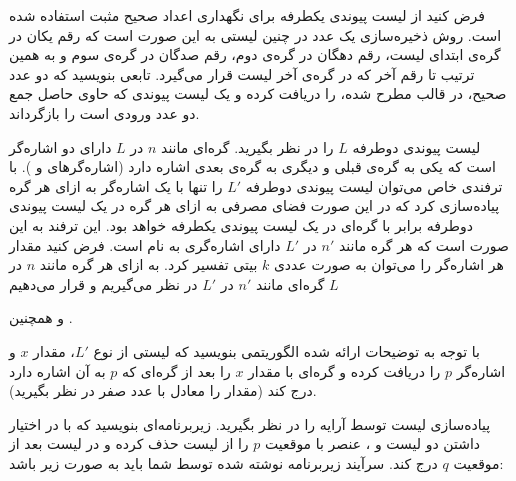  فرض کنید از لیست پیوندی یکطرفه برای نگهداری اعداد صحیح مثبت استفاده شده است. روش ذخیره‌سازی یک عدد در چنین لیستی به این صورت است که رقم یکان در گره‌ی ابتدای لیست، رقم دهگان در گره‌ی دوم، رقم صدگان در گره‌ی سوم و به همین ترتیب تا رقم آخر که در گره‌ی آخر لیست قرار می‌گیرد. تابعی بنویسید که دو عدد صحیح، در قالب مطرح شده، را دریافت کرده و یک لیست پیوندی که حاوی حاصل جمع دو عدد ورودی است را بازگرداند.



 لیست پیوندی دوطرفه {$L$} را در نظر بگیرید. گره‌ای مانند {$n$} در {$L$} دارای دو اشاره‌گر است که یکی به گره‌ی قبلی و دیگری به گره‌ی بعدی اشاره دارد (اشاره‌گرهای {} و {}). با ترفندی خاص می‌توان لیست پیوندی دوطرفه {$L'$} را تنها با یک اشاره‌گر به ازای هر گره پیاده‌سازی کرد که در این صورت فضای مصرفی به ازای هر گره در یک لیست پیوندی دوطرفه برابر با گره‌ای در یک لیست پیوندی یکطرفه خواهد بود. این ترفند به این صورت است که هر گره مانند {$n'$} در {$L'$} دارای اشاره‌گری به نام {} است. فرض کنید مقدار هر اشاره‌گر را می‌توان به صورت عددی {$k$} بیتی تفسیر کرد. به ازای هر گره مانند {$n$} در {$L$} گره‌ای مانند {$n'$} در {$L'$} در نظر می‌گیریم و قرار می‌دهیم { و همچنین 
{}.

با توجه به توضیحات ارائه شده الگوریتمی بنویسید که لیستی از نوع {$L'$}، مقدار {$x$} و اشاره‌گر {$p$} را دریافت کرده و گره‌ای با مقدار {$x$} را بعد از گره‌ای که {$p$} به آن اشاره دارد درج کند (مقدار {} را معادل با عدد صفر در نظر بگیرید).



 پیاده‌سازی لیست توسط آرایه را در نظر بگیرید. زیربرنامه‌ای بنویسید که با در اختیار داشتن دو لیست {} و {}، عنصر با موقعیت {$p$} را از لیست {} حذف کرده و در لیست {} بعد از موقعیت {$q$} درج کند. سرآیند زیربرنامه نوشته شده  توسط شما باید به صورت زیر باشد:
\begin{latin}
\begin{algorithmic}[1]
\Statex	{}
\end{algorithmic}
\end{latin}


}
